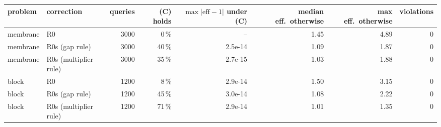 \begin{tabular}{llrrrrrr}
\hline
problem & correction & queries & (C) holds & $\max|\mathrm{eff}-1|$ under (C) & median eff.\ otherwise & max eff.\ otherwise & violations \\
\hline
membrane & R0 & 3000 & 0\,\% & -- & 1.45 & 4.89 & 0 \\
membrane & R0s (gap rule) & 3000 & 40\,\% & 2.5e-14 & 1.09 & 1.87 & 0 \\
membrane & R0s (multiplier rule) & 3000 & 35\,\% & 2.7e-15 & 1.03 & 1.88 & 0 \\
block & R0 & 1200 & 8\,\% & 2.9e-14 & 1.50 & 3.15 & 0 \\
block & R0s (gap rule) & 1200 & 45\,\% & 3.0e-14 & 1.08 & 2.22 & 0 \\
block & R0s (multiplier rule) & 1200 & 71\,\% & 2.9e-14 & 1.01 & 1.35 & 0 \\
\hline
\end{tabular}
